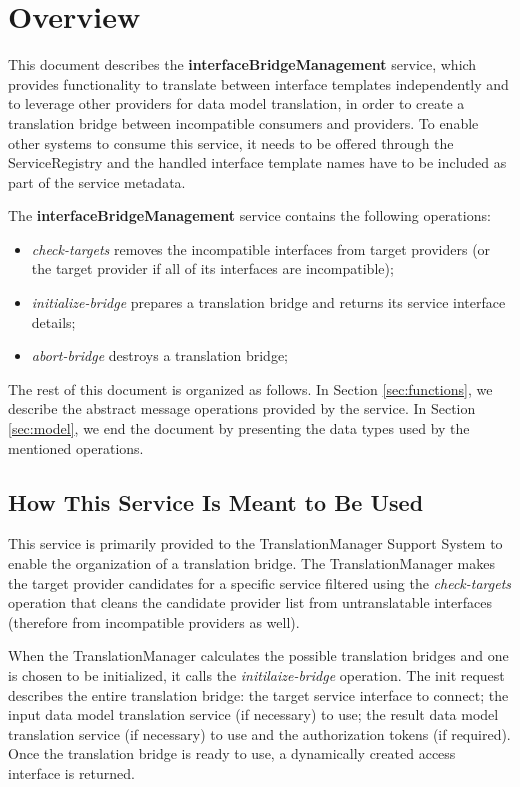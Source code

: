 \documentclass[a4paper]{arrowhead}
\begin{document}
\section{Overview}
\label{sec:overview}
This document describes the \textbf{interfaceBridgeManagement} service, which provides functionality to translate between interface templates independently and to leverage other providers for data model translation, in order to create a translation bridge between incompatible consumers and providers. To enable other systems to consume this service, it needs to be offered through the ServiceRegistry and the handled interface template names have to be included as part of the service metadata.

The \textbf{interfaceBridgeManagement} service contains the following operations:

\begin{itemize}
    \item \textit{check-targets} removes the incompatible interfaces from target providers (or the target provider if all of its interfaces are incompatible);
    \item \textit{initialize-bridge} prepares a translation bridge and returns its service interface details;
    \item \textit{abort-bridge} destroys a translation bridge;
\end{itemize}

The rest of this document is organized as follows.
In Section \ref{sec:functions}, we describe the abstract message operations provided by the service.
In Section \ref{sec:model}, we end the document by presenting the data types used by the mentioned operations.

\subsection{How This Service Is Meant to Be Used}

This service is primarily provided to the TranslationManager Support System to enable the organization of a translation bridge. The TranslationManager makes the target provider candidates for a specific service filtered using the \textit{check-targets} operation that cleans the candidate provider list from untranslatable interfaces (therefore from incompatible providers as well).

When the TranslationManager calculates the possible translation bridges and one is chosen to be initialized, it calls the \textit{initilaize-bridge} operation. The init request describes the entire translation bridge: the target service interface to connect; the input data model translation service (if necessary) to use; the result data model translation service (if necessary) to use and the authorization tokens (if required). Once the translation bridge is ready to use, a dynamically created access interface is returned.
\end{document}
